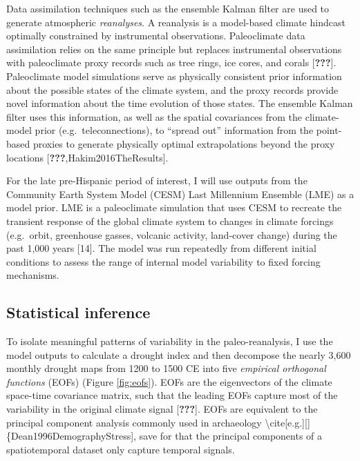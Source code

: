 \documentclass[10pt,letterpaper]{article}
\begin{document}
Data assimilation techniques such as the ensemble Kalman filter are used
to generate atmospheric \textit{reanalyses}. A reanalysis is a
model-based climate hindcast optimally constrained by instrumental
observations. Paleoclimate data assimilation relies on the same
principle but replaces instrumental observations with paleoclimate proxy
records such as tree rings, ice cores, and corals {[}{\textbf{???}}{]}.
Paleoclimate model simulations serve as physically consistent prior
information about the possible states of the climate system, and the
proxy records provide novel information about the time evolution of
those states. The ensemble Kalman filter uses this information, as well
as the spatial covariances from the climate-model prior
(e.g.~teleconnections), to ``spread out'' information from the
point-based proxies to generate physically optimal extrapolations beyond
the proxy locations {[}{\textbf{???}},Hakim2016TheResults{]}.

For the late pre-Hispanic period of interest, I will use outputs from
the Community Earth System Model (CESM) Last Millennium Ensemble (LME)
as a model prior. LME is a paleoclimate simulation that uses CESM to
recreate the transient response of the global climate system to changes
in climate forcings (e.g.~orbit, greenhouse gasses, volcanic activity,
land-cover change) during the past 1,000 years {[}14{]}. The model was
run repeatedly from different initial conditions to assess the range of
internal model variability to fixed forcing mechanisms.

\subsection{Statistical inference}\label{statistical-inference}

To isolate meaningful patterns of variability in the paleo-reanalysis, I
use the model outputs to calculate a drought index and then decompose
the nearly 3,600 monthly drought maps from 1200 to 1500 CE into five
\textit{empirical orthogonal functions} (EOFs) (Figure \ref{fig:eofs}).
EOFs are the eigenvectors of the climate space-time covariance matrix,
such that the leading EOFs capture most of the variability in the
original climate signal {[}{\textbf{???}}{]}. EOFs are equivalent to the
principal component analysis commonly used in archaeology
\textbackslash{}cite{[}e.g.{]}{[}{]}\{Dean1996DemographyStress{]}, save
for that the principal components of a spatiotemporal dataset only
capture temporal signals.
\end{document}
